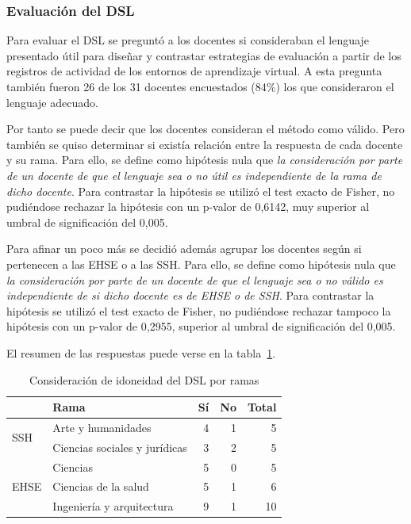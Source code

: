 \subsubsection{Evaluación del DSL}

Para evaluar el DSL se preguntó a los docentes si consideraban el lenguaje presentado útil para diseñar y contrastar estrategias de evaluación a partir de los registros de actividad de los entornos de aprendizaje virtual. A esta pregunta también fueron 26 de los 31 docentes encuestados (84\%) los que consideraron el lenguaje adecuado.

Por tanto se puede decir que los docentes consideran el método como válido. Pero también se quiso determinar si existía relación entre la respuesta de cada docente y su rama. Para ello, se define como hipótesis nula que \emph{la consideración por parte de un docente de que el lenguaje sea o no útil es independiente de la rama de dicho docente}. Para contrastar la hipótesis se utilizó el test exacto de Fisher, no pudiéndose rechazar la hipótesis con un p-valor de 0,6142, muy superior al umbral de significación del 0,005.

Para afinar un poco más se decidió además agrupar los docentes según si pertenecen a las EHSE o a  las SSH. Para ello, se define como hipótesis nula que \emph{la consideración por parte de un docente de que el lenguaje sea o no válido es independiente de si  dicho docente es de EHSE o de SSH}. Para contrastar la hipótesis se utilizó el test exacto de Fisher, no pudiéndose rechazar tampoco la hipótesis con un p-valor de 0,2955, superior al umbral de significación del 0,005.

El resumen de las respuestas puede verse en la tabla~\ref{tab:cap:encuesta:DSL:rama}.

\begin{table}
  \begin{center}
  \begin{tabular}{| l | l | r | r | r |}
    \hline
    & Rama & Sí & No & Total \\
    \hline
    \hline
    \multirow{2}{2.5cm}{SSH} & Arte y humanidades & 4 & 1 & 5  \\
    \cline{2-5}
    & Ciencias sociales y jurídicas & 3 & 2 & 5  \\
    \hline
    \multirow{3}{2.5cm}{EHSE} & Ciencias & 5 & 0 & 5  \\
    \cline{2-5}
    & Ciencias de la salud & 5 & 1 & 6  \\
    \cline{2-5}
    & Ingeniería y arquitectura & 9 & 1 & 10 \\
    \hline
  \end{tabular}
\end{center}
\caption{Consideración de idoneidad del DSL por ramas}
\label{tab:cap:encuesta:DSL:rama}
\end{table}

